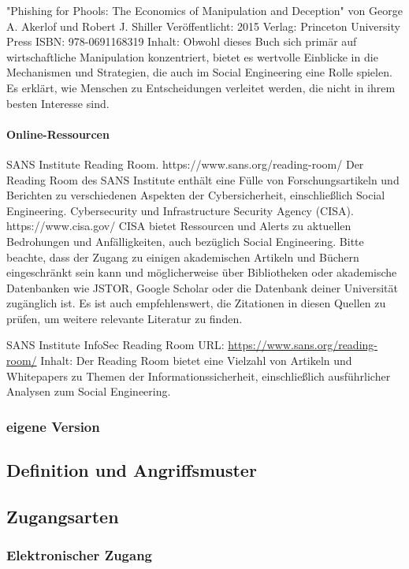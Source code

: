 "Phishing for Phools: The Economics of Manipulation and Deception" von George A. Akerlof und Robert J. Shiller
Veröffentlicht: 2015
Verlag: Princeton University Press
ISBN: 978-0691168319
Inhalt: Obwohl dieses Buch sich primär auf wirtschaftliche Manipulation konzentriert, bietet es wertvolle Einblicke in die Mechanismen und Strategien, die auch im Social Engineering eine Rolle spielen. Es erklärt, wie Menschen zu Entscheidungen verleitet werden, die nicht in ihrem besten Interesse sind.

\paragraph*{Online-Ressourcen}
SANS Institute Reading Room. https://www.sans.org/reading-room/ Der Reading Room des SANS Institute enthält eine Fülle von Forschungsartikeln und Berichten zu verschiedenen Aspekten der Cybersicherheit, einschließlich Social Engineering.
Cybersecurity und Infrastructure Security Agency (CISA). https://www.cisa.gov/ CISA bietet Ressourcen und Alerts zu aktuellen Bedrohungen und Anfälligkeiten, auch bezüglich Social Engineering.
Bitte beachte, dass der Zugang zu einigen akademischen Artikeln und Büchern eingeschränkt sein kann und möglicherweise über Bibliotheken oder akademische Datenbanken wie JSTOR, Google Scholar oder die Datenbank deiner Universität zugänglich ist. Es ist auch empfehlenswert, die Zitationen in diesen Quellen zu prüfen, um weitere relevante Literatur zu finden.

SANS Institute InfoSec Reading Room
URL: \url{https://www.sans.org/reading-room/}
Inhalt: Der Reading Room bietet eine Vielzahl von Artikeln und Whitepapers zu Themen der Informationssicherheit, einschließlich ausführlicher Analysen zum Social Engineering.

\subsubsection*{eigene Version}

\subsection{Definition und Angriffsmuster}

\subsection{Zugangsarten}

\subsubsection{Elektronischer Zugang}
